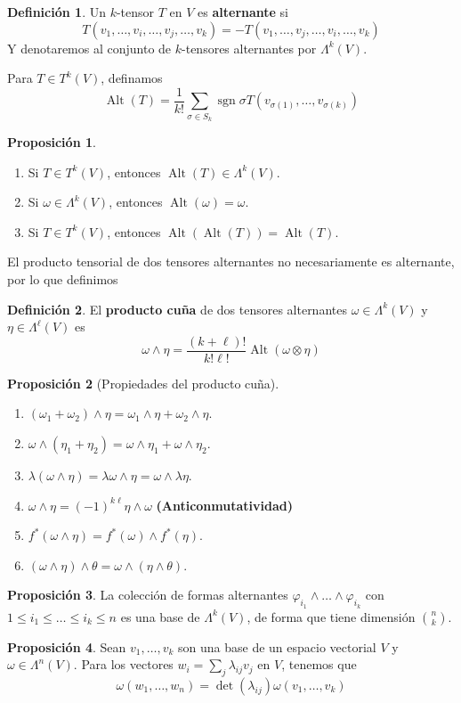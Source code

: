 \documentclass[spanish]{book}
\theoremstyle{definition}
\newtheorem*{defn}{Definición}
\newtheorem*{prop}{Proposición}
\DeclareMathOperator{\Alt}{Alt}
\DeclareMathOperator{\sgn}{sgn}
\begin{document}
	\begin{defn}
		Un $k$-tensor $T$ en $V$ es \textbf{alternante} si
		\[T(v_1,\ldots,v_i,\ldots,v_j,\ldots,v_k)=-T(v_1,\ldots,v_j,\ldots,v_i,\ldots,v_k)\]
		Y denotaremos al conjunto de $k$-tensores alternantes por $\Lambda^k(V)$.
	\end{defn}
	Para $T\in T^k(V)$, definamos
	\[	\Alt(T)=\frac{1}{k!}\sum_{\sigma\in S_k}\sgn\sigma T(v_{\sigma(1)},\ldots,v_{\sigma(k)})\]
	\begin{prop}\leavevmode
		\begin{enumerate}
			\item Si $T\in T^k(V)$, entonces $\Alt(T)\in\Lambda^k(V)$.
			\item Si $\omega\in\Lambda^k(V)$, entonces $\Alt(\omega)=\omega$.
			\item  Si $T\in T^k(V)$, entonces $\Alt(\Alt(T))=\Alt(T)$.
		\end{enumerate}
	\end{prop}
	El producto tensorial de dos tensores alternantes no necesariamente es alternante, por lo que definimos
	\begin{defn}
		El \textbf{producto cuña} de dos tensores alternantes $\omega\in\Lambda^k(V)$ y $\eta\in\Lambda^\ell(V)$ es 
		\[\omega\wedge\eta=\frac{(k+\ell)!}{k!\ell!}\Alt(\omega\otimes\eta)\]
	\end{defn}
	\begin{prop}[Propiedades del producto cuña]\leavevmode
		\begin{enumerate}
			\item $(\omega_1+\omega_2)\wedge\eta=\omega_1\wedge\eta+\omega_2\wedge\eta$.
			\item $\omega\wedge(\eta_1+\eta_2)=\omega\wedge\eta_1+\omega\wedge\eta_2$.
			\item $\lambda(\omega\wedge\eta)=\lambda\omega\wedge\eta=\omega\wedge\lambda\eta$.
			\item $\omega\wedge\eta=(-1)^{k\ell}\eta\wedge\omega$ \textbf{(Anticonmutatividad)}
			\item $f^*(\omega\wedge\eta)=f^*(\omega)\wedge f^*(\eta)$.
			\item $(\omega\wedge\eta)\wedge\theta=\omega\wedge(\eta\wedge\theta)$.
		\end{enumerate}
	\end{prop}
	\begin{prop}\label{prop:base-kth-exterior-power}
		La colección de formas alternantes $\varphi_ {i_1}\wedge\ldots\wedge\varphi_{i_k}$ con $1\leq i_1\leq\ldots\leq i_k\leq n$ es una base de $\Lambda^k(V)$, de forma que tiene dimensión $\binom{n}{k}$.
	\end{prop}
	\begin{prop}
		Sean $v_1,\ldots,v_k$ son una base de un espacio vectorial $V$ y $\omega\in\Lambda^n(V)$. Para los vectores $w_i=\sum_j\lambda_{ij}v_j$ en $V$, tenemos que
		\[\omega(w_1,\ldots,w_n)=\det(\lambda_{ij})\omega(v_1,\ldots,v_k)\]
	\end{prop}
	
\end{document}
